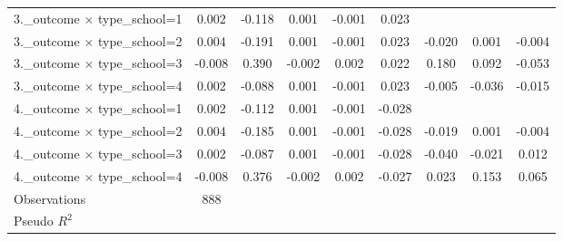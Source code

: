 {\begin{tabular}{l*{8}{c}}
3.\_outcome $\times$ type\_school=1&    0.002\sym{**} &   -0.118\sym{*}  &    0.001\sym{***}&   -0.001\sym{***}&    0.023         &                  &                  &                  \\
3.\_outcome $\times$ type\_school=2&    0.004\sym{**} &   -0.191\sym{*}  &    0.001\sym{***}&   -0.001\sym{***}&    0.023         &   -0.020         &    0.001         &   -0.004         \\
3.\_outcome $\times$ type\_school=3&   -0.008\sym{**} &    0.390\sym{*}  &   -0.002\sym{***}&    0.002\sym{***}&    0.022         &    0.180\sym{***}&    0.092         &   -0.053         \\
3.\_outcome $\times$ type\_school=4&    0.002\sym{**} &   -0.088\sym{*}  &    0.001\sym{***}&   -0.001\sym{***}&    0.023         &   -0.005         &   -0.036\sym{**} &   -0.015         \\
4.\_outcome $\times$ type\_school=1&    0.002\sym{**} &   -0.112\sym{*}  &    0.001\sym{***}&   -0.001\sym{***}&   -0.028\sym{***}&                  &                  &                  \\
4.\_outcome $\times$ type\_school=2&    0.004\sym{**} &   -0.185\sym{*}  &    0.001\sym{***}&   -0.001\sym{***}&   -0.028\sym{***}&   -0.019         &    0.001         &   -0.004         \\
4.\_outcome $\times$ type\_school=3&    0.002\sym{**} &   -0.087\sym{*}  &    0.001\sym{***}&   -0.001\sym{***}&   -0.028\sym{***}&   -0.040\sym{***}&   -0.021         &    0.012         \\
4.\_outcome $\times$ type\_school=4&   -0.008\sym{**} &    0.376\sym{*}  &   -0.002\sym{***}&    0.002\sym{***}&   -0.027\sym{***}&    0.023         &    0.153\sym{**} &    0.065         \\
\midrule
Observations    &      888         &                  &                  &                  &                  &                  &                  &                  \\
Pseudo \(R^{2}\)&                  &                  &                  &                  &                  &                  &                  &                  \\
\bottomrule
\end{tabular}
}
